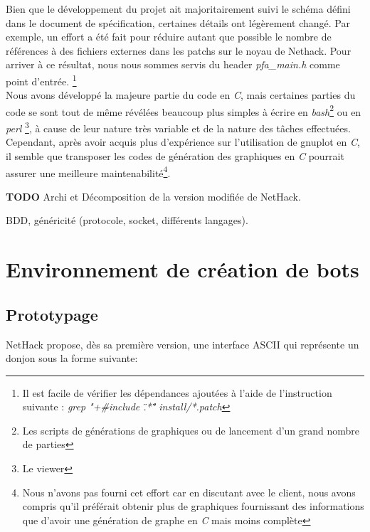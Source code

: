 \documentclass[a4paper,12pt]{article}
\begin{document}
Bien que le développement du projet ait majoritairement suivi le schéma
défini dans le document de spécification, certaines détails ont légèrement
changé. Par exemple, un effort a été fait pour réduire autant que possible
le nombre de références à des fichiers externes dans les patchs sur le noyau
de Nethack. Pour arriver à ce résultat, nous nous sommes servis du header
{\em pfa\_main.h} comme point d'entrée.
\footnote{Il est facile de vérifier les dépendances ajoutées à l'aide de
l'instruction suivante : {\em grep "+#include \".*\"" install/*.patch}}
\\
Nous avons développé la majeure partie du code en {\em C}, mais certaines
parties du code se sont tout de même révélées beaucoup plus simples à
écrire en {\em bash}\footnote{Les scripts de générations de graphiques ou de
  lancement d'un grand nombre de parties} ou en {\em perl}
\footnote{Le viewer}, à cause de leur nature très variable et de la nature
des tâches effectuées. Cependant, après avoir acquis plus d'expérience sur
l'utilisation de gnuplot en {\em C}, il semble que transposer les codes de
génération des graphiques en {\em C} pourrait assurer une meilleure
maintenabilité\footnote{Nous n'avons pas fourni cet effort car en discutant
avec le client, nous avons compris qu'il préférait obtenir plus de
graphiques fournissant des informations que d'avoir une génération de graphe
en {\em C} mais moins complète}.

\textbf{TODO}
Archi et Décomposition de la version modifiée de NetHack.

BDD, généricité (protocole, socket, différents langages).

\section{Environnement de création de bots}

\subsection{Prototypage}

NetHack propose, dès sa première version, une interface ASCII qui représente un donjon sous la forme suivante:
\end{document}
